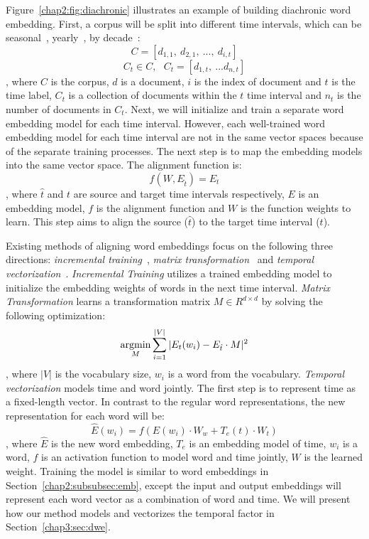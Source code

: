 Figure~\ref{chap2:fig:diachronic} illustrates an example of building diachronic word embedding.
First, a corpus will be split into different time intervals, which can be seasonal~\cite{huang2018examining}, yearly~\cite{yao2018dynamic}, by decade~\cite{hamilton2016diachronic}:
$$C = [d_{1, 1}, ~d_{2, 1}, ~..., ~d_{i, t}] $$
$$C_t \in C, ~~~ C_t = [d_{1, t},~ ...d_{n, t}]$$
, where $C$ is the corpus, $d$ is a document, $i$ is the index of document and $t$ is the time label, $C_t$ is a collection of documents within the $t$ time interval and $n_t$ is the number of documents in $C_t$.
Next, we will initialize and train a separate word embedding model for each time interval.
However, each well-trained word embedding model for each time interval are not in the same vector spaces because of the separate training processes. 
The next step is to map the embedding models into the same vector space.
The alignment function is:
$$f(W, E_{\hat{t}}) = E_t$$
, where $\hat{t}$ and $t$ are source and target time intervals respectively, $E$ is an embedding model, $f$ is the alignment function and $W$ is the function weights to learn.
This step aims to align the source ($\hat{t}$) to the target time interval ($t$).

Existing methods of aligning word embeddings focus on the following three directions: \textit{incremental training}~\cite{kim2014temporal}, \textit{matrix transformation}~\cite{kulkarni2015statistically, hamilton2016diachronic, yao2018dynamic} and \textit{temporal vectorization}~\cite{rosenfeld2018deep, huang2019neural}. 
\textit{Incremental Training} utilizes a trained embedding model to initialize the embedding weights of words in the next time interval.
\textit{Matrix Transformation} learns a transformation matrix $M \in R^{d \times d}$ by solving the following optimization:
$$\operatorname*{argmin}_M \sum_{i=1}^{|V|}|E_t(w_i) - E_{\hat{t}} \cdot M|^2$$
, where $|V|$ is the vocabulary size, $w_i$ is a word from the vocabulary.
\textit{Temporal vectorization} models time and word jointly. The first step is to represent time as a fixed-length vector. In contrast to the regular word representations, the new representation for each word will be:
$$\hat{E}(w_i) = f(E(w_i) \cdot W_w + T_e(t) \cdot W_t)$$
, where $\hat{E}$ is the new word embedding, $T_e$ is an embedding model of time, $w_i$ is a word, $f$ is an activation function to model word and time jointly, $W$ is the learned weight.
Training the model is similar to word embeddings in Section~\ref{chap2:subsubsec:emb}, except the input and output embeddings will represent each word vector as a combination of word and time.
We will present how our method models and vectorizes the temporal factor in Section~\ref{chap3:sec:dwe}.


